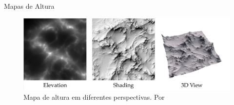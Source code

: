\begin{frame}{Mapas de Altura}
    
    \begin{figure}[H]
        \centering
        \includegraphics[width=.75\textwidth]{img/hmap}
        \caption{Mapa de altura em diferentes perspectivas. Por \cite{dachsbacher2006interactive}}
        \label{fig:hmap}
    \end{figure}
\end{frame}